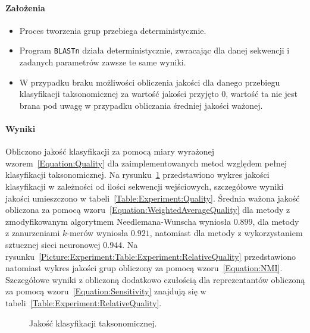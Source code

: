             \paragraph{Założenia}

                \begin{itemize}
                    \item {
                        Proces tworzenia grup przebiega deterministycznie.
                    }
                    \item {
                        Program \texttt{BLASTn} działa deterministycznie, zwracając dla danej sekwencji i zadanych parametrów zawsze te same wyniki.
                    }
                    \item {
                        W przypadku braku możliwości obliczenia jakości dla danego przebiegu klasyfikacji taksonomicznej za wartość jakości przyjęto $0$, wartość ta nie jest brana pod uwagę w przypadku obliczania średniej jakości ważonej.
                    }
                \end{itemize}

            \paragraph{Wyniki}
                Obliczono jakość klasyfikacji za pomocą miary wyrażonej wzorem~\ref{Equation:Quality} dla zaimplementowanych metod względem pełnej klasyfikacji taksonomicznej. Na rysunku~\ref{Picture:Experiment:Quality} przedstawiono wykres jakości klasyfikacji w zależności od ilości sekwencji wejściowych, szczegółowe wyniki jakości umieszczono w tabeli~\ref{Table:Experiment:Quality}. Średnia ważona jakość obliczona za pomocą wzoru~\ref{Equation:WeightedAverageQuality} dla metody z zmodyfikowanym algorytmem Needlemana-Wunscha wyniosła $0.899$, dla metody z zanurzeniami $k$-merów wyniosła $0.921$, natomiast dla metody z wykorzystaniem sztucznej sieci neuronowej $0.944$. Na rysunku~\ref{Picture:Experiment:Table:Experiment:RelativeQuality} przedstawiono natomiast wykres jakości grup obliczony za pomocą wzoru~\ref{Equation:NMI}. Szczegółowe wyniki z obliczoną dodatkowo czułością dla reprezentantów obliczoną za pomocą wzoru~\ref{Equation:Sensitivity} znajdują się w tabeli~\ref{Table:Experiment:RelativeQuality}. 

                \begin{figure}
                    \begin{center}
                        
                    \end{center}
                    \caption{
                        Jakość klasyfikacji taksonomicznej.
                    }\label{Picture:Experiment:Quality}
                \end{figure}


